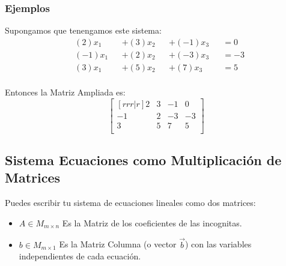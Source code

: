 \documentclass[12pt, fleqn]{report}                             %
\begin{document}
                \subsubsection{Ejemplos}

                    Supongamos que tenengamos este sistema:
                    \begin{equation*}
                        \begin{split}
                            &(2)x_1  &&+  (3)x_2 &&+ (-1)x_3 &&= 0    \\
                            &(-1)x_1 &&+  (2)x_2 &&+ (-3)x_3 &&= -3   \\
                            &(3)x_1  &&+  (5)x_2 &&+ (7)x_3  &&= 5    \\
                        \end{split}
                    \end{equation*}

                    Entonces la Matriz Ampliada es:
                    \begin{equation*}
                        \begin{bmatrix}[rrr|r]
                            2  & 3 & -1 & 0  \\
                            -1 & 2 & -3 & -3 \\
                            3  & 5 & 7  & 5  \\
                        \end{bmatrix}
                    \end{equation*}


            \clearpage
            \subsection{Sistema Ecuaciones como Multiplicación de Matrices}

                Puedes escribir tu sistema de ecuaciones lineales como dos matrices:
                \begin{itemize}
                    \item $A \in M_{m \times n}$ Es la Matriz de los coeficientes de las incognitas.

                    \item $b \in M_{m \times 1}$ Es la Matriz Columna (o vector $\vec{b}$) con las variables 
                        independientes de cada ecuación.
                \end{itemize}
\end{document}
